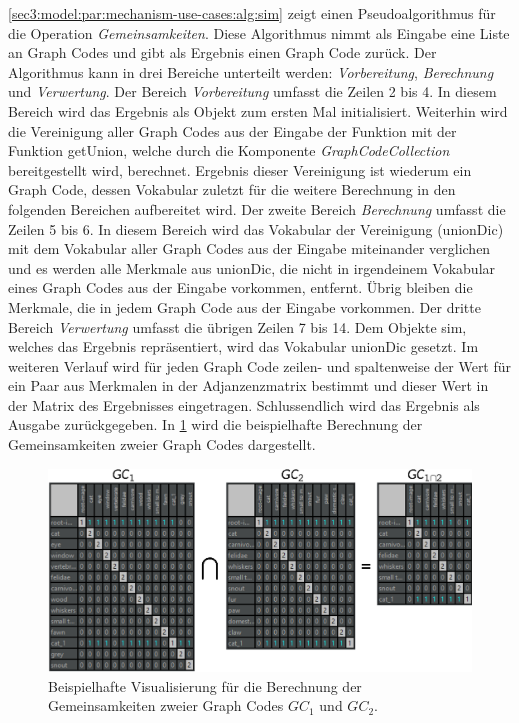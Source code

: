 \cref{sec3:model:par:mechanism-use-cases:alg:sim} zeigt einen Pseudoalgorithmus für die Operation \textit{Gemeinsamkeiten}.
Diese Algorithmus nimmt als Eingabe eine Liste an Graph Codes und gibt als Ergebnis einen Graph Code zurück.
Der Algorithmus kann in drei Bereiche unterteilt werden: \textit{Vorbereitung}, \textit{Berechnung} und \textit{Verwertung}.
Der Bereich \textit{Vorbereitung} umfasst die Zeilen 2 bis 4.
In diesem Bereich wird das Ergebnis als Objekt zum ersten Mal initialisiert.
Weiterhin wird die Vereinigung aller Graph Codes aus der Eingabe der Funktion mit der Funktion getUnion, welche durch die Komponente \textit{GraphCodeCollection} bereitgestellt wird, berechnet.
Ergebnis dieser Vereinigung ist wiederum ein Graph Code, dessen Vokabular zuletzt für die weitere Berechnung in den folgenden Bereichen aufbereitet wird.
Der zweite Bereich \textit{Berechnung} umfasst die Zeilen 5 bis 6.
In diesem Bereich wird das Vokabular der Vereinigung (unionDic) mit dem Vokabular aller Graph Codes aus der Eingabe miteinander verglichen und es werden alle Merkmale aus unionDic, die nicht in irgendeinem Vokabular eines Graph Codes aus der Eingabe vorkommen, entfernt.
Übrig bleiben die Merkmale, die in jedem Graph Code aus der Eingabe vorkommen.
Der dritte Bereich \textit{Verwertung} umfasst die übrigen Zeilen 7 bis 14.
Dem Objekte sim, welches das Ergebnis repräsentiert, wird das Vokabular unionDic gesetzt.
Im weiteren Verlauf wird für jeden Graph Code zeilen- und spaltenweise der Wert für ein Paar aus Merkmalen in der Adjanzenzmatrix bestimmt und dieser Wert in der Matrix des Ergebnisses eingetragen.
Schlussendlich wird das Ergebnis als Ausgabe zurückgegeben.
In \cref{sec3:model:par:mechanism-use-cases:fig:gc1-2-similarities} wird die beispielhafte Berechnung der Gemeinsamkeiten zweier Graph Codes dargestellt.

\begin{figure}[!ht]
  \centering
  \includegraphics{chapter/chapter_3/algorithms/gc1-2-similarities-ex}
  \caption{Beispielhafte Visualisierung für die Berechnung der Gemeinsamkeiten zweier Graph Codes $GC_1$ und $GC_2$.}
  \label{sec3:model:par:mechanism-use-cases:fig:gc1-2-similarities}
\end{figure}

